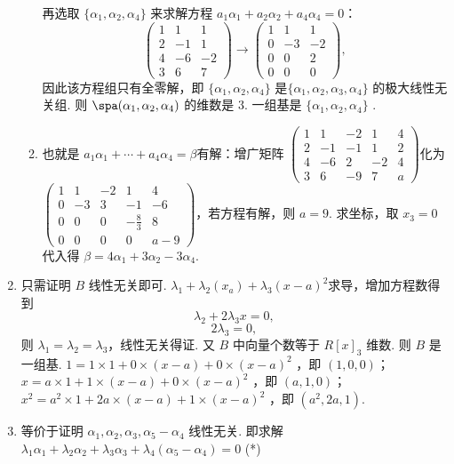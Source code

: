 \begin{enumerate}
\begin{enumerate}
        再选取 $\{\alpha_1,\alpha_2,\alpha_4\}$ 来求解方程 $a_1\alpha_1+a_2\alpha_2+a_4\alpha_4=0$：
        \[\begin{pmatrix}
            1 & 1 & 1\\
            2 & -1 & 1\\
            4 & -6 & -2\\
            3 & 6 & 7\end{pmatrix}\rightarrow\begin{pmatrix}
            1 & 1 & 1\\
            0 & -3 & -2\\
            0 & 0 & 2\\
            0 & 0 & 0\end{pmatrix},\]
        因此该方程组只有全零解，即 $\{\alpha_1,\alpha_2,\alpha_4\}$ 是$\{\alpha_1,\alpha_2,\alpha_3,\alpha_4\}$  的极大线性无关组. 则 $\spa(\alpha_1,\alpha_2,\alpha_4)$ 的维数是 $3$. 一组基是 $\{\alpha_1,\alpha_2,\alpha_4\}$ .
        \item 也就是 $a_1\alpha_1+\cdots+a_4\alpha_4=\beta$有解：增广矩阵 $\begin{pmatrix}
            1 & 1 & -2&1&4\\
            2 & -1 & -1&1&2\\
            4 & -6 & 2&-2&4\\
            3 & 6 & -9&7&a\end{pmatrix}$化为 $\begin{pmatrix}
            1 & 1 & -2&1&4\\
            0 & -3 & 3&-1&-6\\
            0 & 0 & 0&-\frac 83&8\\
            0 & 0 & 0&0&a-9\end{pmatrix}$，若方程有解，则 $a=9$. 求坐标，取 $x_3=0$ 代入得 $\beta=4\alpha_1+3\alpha_2-3\alpha_4$.
    \end{enumerate}
    \item 只需证明 $B$ 线性无关即可. $\lambda_1+\lambda_2(x_a)+\lambda_3(x-a)^2$求导，增加方程数得到
	\[\lambda_2+2\lambda_3x=0,\]
	\[2\lambda_3=0,\]
	则 $\lambda_1=\lambda_2=\lambda_3$，线性无关得证. 又 $B$ 中向量个数等于 $R[x]_3$ 维数. 则 $B$ 是一组基. $1=1\times 1+0\times (x-a)+0\times(x-a)^2$ ，即 $(1,0,0)$；$x=a\times 1+1\times (x-a)+0\times(x-a)^2$ ，即 $(a,1,0)$；$x^2=a^2\times 1+2a\times (x-a)+1\times(x-a)^2$ ，即 $(a^2,2a,1)$.
    \item 等价于证明 $\alpha_1,\alpha_2,\alpha_3,\alpha_5-\alpha_4$ 线性无关. 即求解 $\lambda_1\alpha_1+\lambda_2\alpha_2+\lambda_3\alpha_3+\lambda_4(\alpha_5-\alpha_4)=0$ (*)


\end{enumerate}
